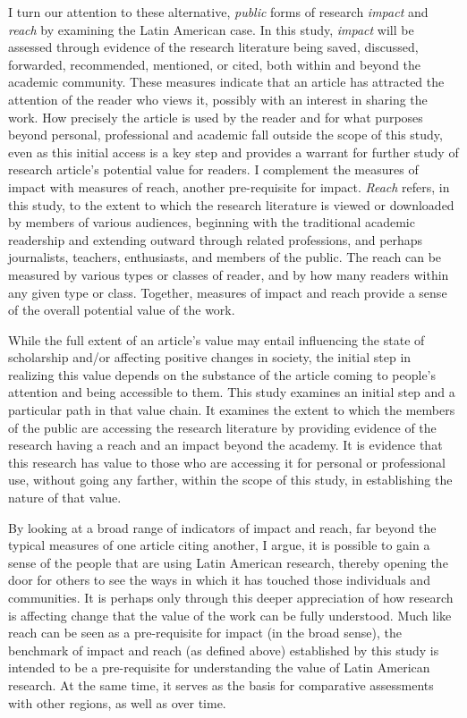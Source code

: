 I turn our attention to these alternative, \emph{public} forms of research \emph{impact} and \emph{reach} by examining the Latin American case. In this study, \emph{impact} will be assessed through evidence of the research literature being saved, discussed, forwarded, recommended, mentioned, or cited, both within and beyond the academic community. These measures indicate that an article has attracted the attention of the reader who views it, possibly with an interest in sharing the work. How precisely the article is used by the reader and for what purposes beyond personal, professional and academic fall outside the scope of this study, even as this initial access is a key step and provides a warrant for further study of research article's potential value for readers. I complement the measures of impact with measures of reach, another pre-requisite for impact. \emph{Reach} refers, in this study, to the extent to which the research literature is viewed or downloaded by members of various audiences, beginning with the traditional academic readership and extending outward through related professions, and perhaps journalists, teachers, enthusiasts, and members of the public. The reach can be measured by various types or classes of reader, and by how many readers within any given type or class. Together, measures of impact and reach provide a sense of the overall potential value of the work.

While the full extent of an article's value may entail influencing the state of scholarship and\slash or affecting positive changes in society, the initial step in realizing this value depends on the substance of the article coming to people's attention and being accessible to them. This study examines an initial step and a particular path in that value chain. It examines the extent to which the members of the public are accessing the research literature by providing evidence of the research having a reach and an impact beyond the academy. It is evidence that this research has value to those who are accessing it for personal or professional use, without going any farther, within the scope of this study, in establishing the nature of that value.

By looking at a broad range of indicators of impact and reach, far beyond the typical measures of one article citing another, I argue, it is possible to gain a sense of the people that are using Latin American research, thereby opening the door for others to see the ways in which it has touched those individuals and communities. It is perhaps only through this deeper appreciation of how research is affecting change that the value of the work can be fully understood. Much like reach can be seen as a pre-requisite for impact (in the broad sense), the benchmark of impact and reach (as defined above) established by this study is intended to be a pre-requisite for understanding the value of Latin American research. At the same time, it serves as the basis for comparative assessments with other regions, as well as over time.

